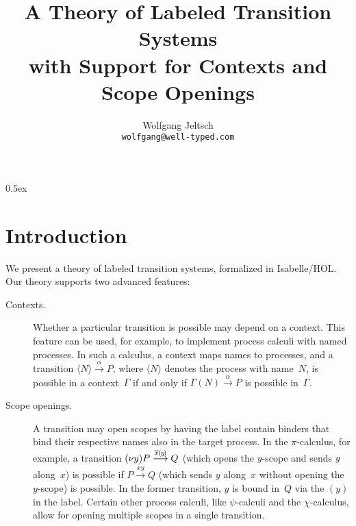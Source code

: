 \documentclass[a4paper,11pt]{article}
\begin{document}
\title{A Theory of Labeled Transition Systems\\with Support for Contexts and Scope Openings}
\author{Wolfgang Jeltsch\\\small\texttt{wolfgang@well-typed.com}}

\maketitle

\tableofcontents

\parindent 0pt\parskip 0.5ex

\section{Introduction}

We present a theory of labeled transition systems, formalized in Isabelle/HOL. Our theory supports
two advanced features:
\begin{description}

\item[Contexts.]

Whether a particular transition is possible may depend on a context. This feature can be used, for
example, to implement process calculi with named processes. In such a calculus, a context maps names
to processes, and a transition $\langle N\rangle \overset{\alpha}{\longrightarrow} P$, where
$\langle N\rangle$ denotes the process with name~$N$, is possible in a context~$\Gamma$ if and only
if $\Gamma(N) \overset{\alpha}{\longrightarrow} P$ is possible in~$\Gamma$.

\item[Scope openings.]

A transition may open scopes by having the label contain binders that bind their respective names
also in the target process. In the $\pi$-calculus, for example, a transition
$(\nu y)P \overset{\overline{x}\hspace{-0.03em}(\hspace{-.06em}y\hspace{-.12em})}{\longrightarrow}
Q$ (which opens the $y$-scope and sends $y$ along~$x$) is possible if $P
\overset{\overline{x}y}{\longrightarrow} Q$ (which sends $y$ along~$x$ without opening the
$y$-scope) is possible. In the former transition, $y$ is bound in~$Q$ via the $(y)$ in the label.
Certain other process calculi, like $\psi$-calculi and the $\chi$-calculus, allow for opening
multiple scopes in a single transition.

\end{description}


\end{document}
